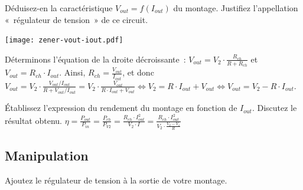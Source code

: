 \documentclass{../template/labo}
\begin{document}
\Question
{
	Déduisez-en la caractéristique $V_{out} = f(I_{out})$ du montage.
	Justifiez l'appellation «~régulateur de tension~» de ce circuit.

}
{

\begin{center}
\texttt{[image: zener-vout-iout.pdf]}
\end{center}

Déterminons l'équation de la droite décroissante~: $V_{out} = V_2 \cdot \frac{R_{ch}}{R + R_{ch}}$ et $V_{out} = R_{ch} \cdot I_{out}$. Ainsi, $R_{ch} = \frac{V_{out}}{I_{out}}$, et donc $V_{out} = V_2 \cdot \frac{V_{out}/I_{out}}{R+ V_{out}/I_{out}} = V_2 \cdot \frac{V_{out}}{R\cdot I_{out} + V_{out}} \Leftrightarrow V_2 = R\cdot I_{out} + V_{out} \Leftrightarrow V_{out} = V_2 - R\cdot I_{out}$.

}%
	\label{Q:24}


\Question
{
	Établissez l'expression du rendement du montage en fonction de $I_{out}$.
	Discutez le résultat obtenu.
}
{
$\eta = \frac{P_{out}}{P_{in}} = \frac{P_{ch}}{P_{V2}} = \frac{R_{ch} \cdot I_{out}^2}{V_2 \cdot I} = \frac{R_{ch} \cdot I_{out}^2}{V_2 \cdot \frac{V_2 - V_z}{R}}
$
}%
	\label{Q:25}

\vspace{-0.5cm}

\subsection{Manipulation}
\Question
{
	Ajoutez le régulateur de tension à la sortie de votre montage.
}
{}%
	\label{Q:26}
\end{document}

